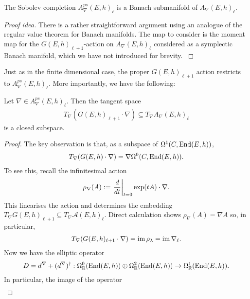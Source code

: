 \documentclass[12pt]{ociamthesis}  %
\begin{document}
\begin{lemma}
  The Sobolev completion $A^{ps}_\nabla(E,h)_\ell$ is a
  Banach submanifold of $A_\nabla(E,h)_\ell$.
  \begin{proof}[Proof idea]
    There is a rather straightforward argument using an analogue
    of the regular value theorem for Banach manifolds. The map
    to consider is the moment map for the $G(E,h)_{\ell+1}$-action
    on $A_\nabla(E,h)_\ell$ considered as a symplectic
    Banach manifold, which we have not introduced for brevity.
    \cite[Proposition 5.8]{neitzke2021}
  \end{proof}
\end{lemma}
Just as in the finite dimensional case, the proper $G(E,h)_{\ell+1}$
action restricts to $A^{ps}_\nabla(E,h)_\ell$.
More importantly, we have the following:
\begin{lemma}\label{lem:holomorphic_tangent_is_closed}
  Let $\nabla\in A^{ps}_\nabla(E,h)_{\ell}$. Then the tangent space
  \begin{align*}
    T_\nabla(G(E,h)_{\ell+1}\cdot\nabla) \subseteq T_\nabla A_\nabla(E,h)_\ell
  \end{align*}
  is a closed subspace.
  \begin{proof}
    The key observation is that, as a subspace of
    $\Omega^1(C,\operatorname{End}(E,h))$,
    \begin{align*}
      T_\nabla (G(E,h)\cdot\nabla) = \nabla\Omega^0(C,\operatorname{End}(E,h)).
    \end{align*}
    To see this, recall the infinitesimal action
    \begin{align*}
      \rho_\nabla(A) := \left.{\frac{d}{dt}}\right\vert_{t=0} \exp(tA)\cdot\nabla.
    \end{align*}
    This linearises the action and determines the embedding
    $T_\nabla G(E,h)_{\ell+1}\subseteq T_\nabla \mathcal A(E,h)_\ell$.
    Direct calculation shows $\rho_\nabla(A) = \nabla A$
    so, in particular,
    \begin{align*}
      T_\nabla(G(E,h)_{\ell+1}\cdot\nabla) = \operatorname{im}\rho_\lambda = \operatorname{im}\nabla_\ell.
    \end{align*}
    Now we have the elliptic operator
    \begin{align*}
      D = d^\nabla + (d^\nabla)^\dagger :
      \Omega^0_{\mathbb R}(\operatorname{End}(E,h)) \oplus
      \Omega^2_{\mathbb R}(\operatorname{End}(E,h)) \to
      \Omega^1_{\mathbb R}(\operatorname{End}(E,h)).
    \end{align*}
    In particular, the image of the operator
    \begin{align*}

\end{align*}
\end{proof}
\end{lemma}
\end{document}
